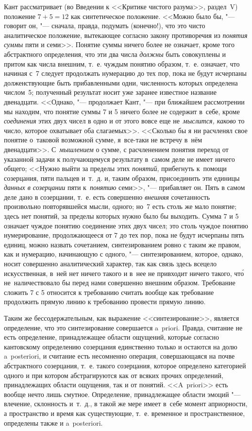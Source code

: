 Кант рассматривает (во Введении к <<Критике чистого разума>>, раздел~V)
положение $7+5=12$ как синтетическое положение. <<Можно было бы, "---
говорит он, "--- сначала, правда, подумать (конечно!), что это чисто
аналитическое положение, вытекающее согласно закону противоречия из
{\em понятия суммы} пяти и семи>>. Понятие суммы ничего более не означает,
кроме того абстрактного определения, что эти два числа {\em должны} быть
совокуплены и притом как числа внешним, т.~е. чуждым понятию образом, т.~е.
означает, что начиная с~7 следует продолжать нумерацию до тех пор, пока не
будут исчерпаны долженствующие быть прибавленными одни, численность которых
определена числом~5; полученный результат носит уже заранее известное название
двенадцати. <<Однако, "--- продолжает Кант, "--- при ближайшем рассмотрении мы
находим, что понятие суммы 7 и 5 ничего более не содержит в~себе, кроме
{\em соединения} этих двух чисел в одно и от этого вовсе еще
не~{\em мыслится, каково} то число, которое охватывает оба слагаемых>>.
<<Сколько бы я ни расчленял свое понятие о~таковой возможной сумме,
я~все-таки не встречу в~нём двенадцати>>. С~{\em мышлением} о сумме,
с расчленением понятия переход от указанной задачи к получающемуся результату
в~самом деле не имеет ничего общего; <<Нужно выйти за пределы этих
{\em понятий}, прибегнуть к~помощи
созерцания, пяти пальцев и~т.~д. и, таким образом, присоединить эти
единицы {\em данных в созерцании} пяти к~{\em понятию} семи>>, "--- прибавляет
он. Пять в самом деле дано в созерцании, т.~е. есть совершенно {\em внешняя}
сочетанность произвольно повторявшейся мысли, одного; но~7 есть столь же мало
понятие; здесь нет понятий, за пределы которых нужно было бы выходить. Сумма
7 и 5 означает чуждое понятию соединение этих двух чисел; это столь чуждое
понятию нумерирование, продолжающееся от 7 до тех пор, пока не будут исчерпаны
пять единиц, можно назвать сочетанием, синтезированием ровно с таким же правом,
как и нумерацию, начинающую с одного, "--- синтезированием, которое, однако,
носит совершенно аналитический характер, так как связь здесь всецело
искусственная, в~ней нет ничего такого и в~нее не привходит ничего такого,
чт\'{о} не~наличествовало бы перед нами совершенно внешним образом. Требование
сложить 7 с 5 относится к требованию считать вообще как требование продолжить
прямую линию к требованию провести прямую линию.

Таким же бессодержательным, как выражение <<синтезирование>>, является
определение, что это синтезирование совершается a~priori. Правда, считание не
есть определение, принадлежащее области ощущений, которые согласно кантовскому
определению созерцания единственно только и остаются на долю a~poste\-riori, и
считание есть несомненно операция, совершающаяся на почве абстрактного
созерцания, т.~е. такого созерцания, которое определено категорией одного и при
котором абстрагируются как от всяких прочих определений, принадлежащих области
ощущения, так и от понятий. <<A~priori>> есть вообще нечто лишь смутное.
Определение, принадлежащее области эмоций "--- влечение, склонность и~т.~д.,
в такой же мере имеет в~себе момент априорности, а пространство и время как
существующие, т.~е. временное и пространственное, определены также и
a~poste\-ri\-ori.

